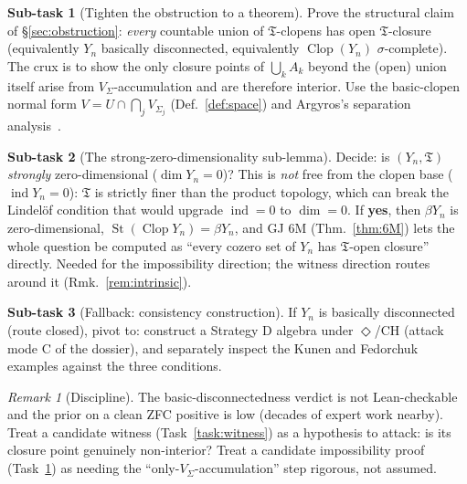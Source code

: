 \documentclass[11pt]{article}
\theoremstyle{definition}
\newtheorem{task}{Sub-task}
\theoremstyle{remark}
\newtheorem{remark}[theorem]{Remark}
\newcommand{\Clop}{\operatorname{Clop}}
\newcommand{\St}{\operatorname{St}}
\newcommand{\Y}{Y_n}
\newcommand{\T}{\mathfrak{T}}
\begin{document}
\begin{task}[Tighten the obstruction to a theorem]\label{task:tighten}
Prove the structural claim of \S\ref{sec:obstruction}: \emph{every} countable union
of $\T$-clopens has open $\T$-closure (equivalently $\Y$ basically disconnected,
equivalently $\Clop(\Y)$ $\sigma$-complete). The crux is to show the only closure
points of $\bigcup_k A_k$ beyond the (open) union itself arise from
$V_\Sigma$-accumulation and are therefore interior. Use the basic-clopen normal form
$V=U\cap\bigcap_j V_{\Sigma_j}$ (Def.~\ref{def:space}) and Argyros's separation
analysis~\cite[1.3]{Argyros1983}.
\end{task}

\begin{task}[The strong-zero-dimensionality sub-lemma]\label{task:szd}
Decide: is $(\Y,\T)$ \emph{strongly} zero-dimensional ($\dim\Y=0$)? This is
\emph{not} free from the clopen base ($\operatorname{ind}\Y=0$): $\T$ is strictly
finer than the product topology, which can break the Lindel\"of condition that would
upgrade $\operatorname{ind}=0$ to $\dim=0$. If \textbf{yes}, then $\beta\Y$ is
zero-dimensional, $\St(\Clop\Y)=\beta\Y$, and GJ 6M (Thm.~\ref{thm:6M}) lets the
whole question be computed as ``every cozero set of $\Y$ has $\T$-open closure''
directly. Needed for the impossibility direction; the witness direction routes
around it (Rmk.~\ref{rem:intrinsic}).
\end{task}

\begin{task}[Fallback: consistency construction]\label{task:cons}
If $\Y$ is basically disconnected (route closed), pivot to: construct a Strategy D
algebra under $\Diamond$/CH (attack mode C of the dossier), and separately inspect
the Kunen and Fedorchuk examples against the three conditions.
\end{task}

\begin{remark}[Discipline]\label{rem:discipline}
The basic-disconnectedness verdict is not Lean-checkable and the prior on a clean
ZFC positive is low (decades of expert work nearby). Treat a candidate witness
(Task~\ref{task:witness}) as a hypothesis to attack: is its closure point genuinely
non-interior? Treat a candidate impossibility proof (Task~\ref{task:tighten}) as
needing the ``only-$V_\Sigma$-accumulation'' step rigorous, not assumed.
\end{remark}
\end{document}
